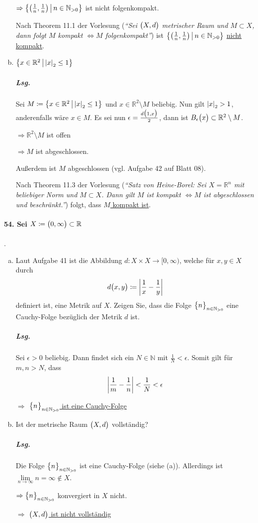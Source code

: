 \documentclass{scrreprt}
\begin{document}
\begin{enumerate}[(a)]
  $\Rightarrow
  \qty{\qty(\frac{1}{n}, \frac{1}{n}) \,\middle |\, n \in \mathbb{N}_{> 0}}$
  ist nicht folgenkompakt.

  Nach Theorem 11.1 der Vorlesung (\emph{``Sei $\qty\big(X, d)$ metrischer Raum
    und $M \subset X$, dann folgt $M$ kompakt $\iff M$ folgenkompakt''})
  ist $\qty{\qty(\frac{1}{n}, \frac{1}{n}) \,\middle |\, n \in \mathbb{N}_{> 0}}$
  \underline{nicht kompakt}.

\item $\qty\big{x \in \mathbb{R}^2 \,{\big |}\, \abs{x}_2 \leq 1}$

  \subparagraph{Lsg.} Sei $M \coloneqq
  \qty\big{x \in \mathbb{R}^2 \,{\big |}\, \abs{x}_2 \leq 1}$ und
  $x \in \mathbb{R}^2 \setminus M$ beliebig.
  Nun gilt $\abs{x}_2 > 1$, anderenfalls wäre $x \in M$.
  Es sei nun $\epsilon = \frac{d\qty\big(1, x)}{2}$, dann ist
  $B_{\epsilon}\qty\big(x) \subset \mathbb{R}^2 \setminus M$.

  $\Rightarrow \mathbb{R}^2 \setminus M$ ist offen

  $\Rightarrow M$ ist abgeschlossen.

  Außerdem ist $M$ abgeschlossen (vgl. Aufgabe 42 auf Blatt 08).

  Nach Theorem 11.3 der Vorlesung (\emph{``Satz von Heine-Borel: Sei
    $X = \mathbb{R}^n$ mit beliebiger Norm und $M \subset X$.
    Dann gilt $M$ ist kompakt $\iff M$ ist abgeschlossen und beschränkt.''})
  folgt, dass \underline{$M$ kompakt ist}.
\end{enumerate}

\newpage
\paragraph{54. Sei $X \coloneqq \qty\big(0, \infty) \subset \mathbb{R}$}.
\begin{enumerate}[(a)]
\item Laut Aufgabe 41 ist die Abbildung
  $d \colon X \times X \to \big[0, \infty \big)$, welche für $x, y \in X$
  durch
  \[
    d\qty\big(x, y) \coloneqq \abs{\frac{1}{x} - \frac{1}{y}}
  \]
  definiert ist, eine Metrik auf $X$.
  Zeigen Sie, dass die Folge $\qty\big{n}_{n \in \mathbb{N}_{> 0}}$ eine
  Cauchy-Folge bezüglich der Metrik $d$ ist.

  \subparagraph{Lsg.} Sei $\epsilon > 0$ beliebig.
  Dann findet sich ein $N \in \mathbb{N}$ mit $\frac{1}{N} < \epsilon$.
  Somit gilt für $m, n > N$, dass
  \[
    \abs{\frac{1}{m} - \frac{1}{n}} < \frac{1}{N} < \epsilon
  \]

  $\Rightarrow$ \underline{$\qty\big{n}_{n \in \mathbb{N}_{> 0}}$ ist eine
    Cauchy-Folge}

\item Ist der metrische Raum $\qty\big(X, d)$ vollständig?

  \subparagraph{Lsg.} Die Folge $\qty\big{n}_{n \in \mathbb{N}_{> 0}}$
  ist eine Cauchy-Folge (siehe (a)).
  Allerdings ist $\underset{n \to \infty}\lim n = \infty \notin X$.

  $\Rightarrow \qty\big{n}_{n \in \mathbb{N}_{> 0}}$ konvergiert in $X$ nicht.

  $\Rightarrow$ \underline{$\qty\big(X, d)$ ist nicht vollständig}
\end{enumerate}
\end{document}
